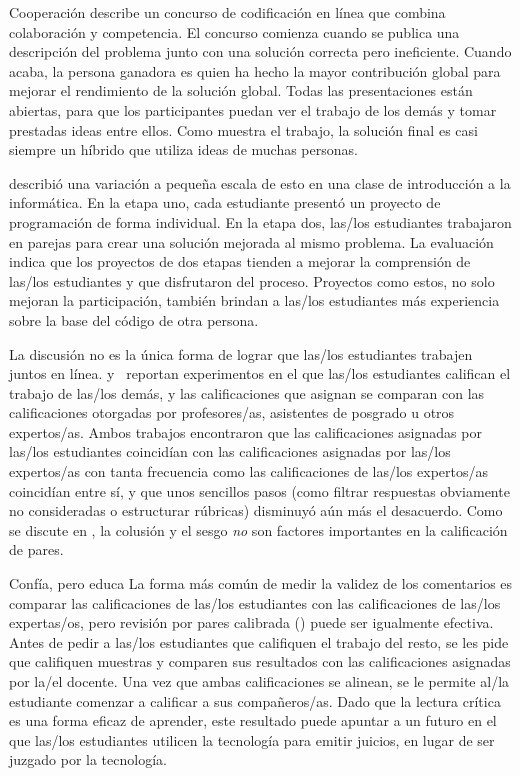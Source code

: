 \begin{aside}{Cooperación}
  \cite{Gull2004} describe un concurso de codificación en línea que combina colaboración y competencia.
  El concurso comienza cuando se publica una descripción del problema junto con una solución correcta pero ineficiente.
  Cuando acaba,
  la persona ganadora es quien ha hecho la mayor contribución global
  para mejorar el rendimiento de la solución global.
  Todas las presentaciones están abiertas,
  para que los participantes puedan ver el trabajo de los demás y tomar prestadas ideas entre ellos.
  Como muestra el trabajo,
  la solución final es casi siempre un híbrido que utiliza ideas de muchas personas.

  \cite{Batt2018} describió una variación a pequeña escala de esto en una clase de introducción a la informática.
  En la etapa uno,
  cada estudiante presentó un proyecto de programación de forma individual.
  En la etapa dos,
  las/los estudiantes trabajaron en parejas para crear una solución mejorada al mismo problema.
  La evaluación indica que los proyectos de dos etapas tienden a mejorar la comprensión de las/los estudiantes
  y que disfrutaron del proceso.
  Proyectos como estos, no solo mejoran la participación,
  también brindan a las/los estudiantes más experiencia sobre la base del código de otra persona.
\end{aside}

La discusión no es la única forma de lograr que las/los estudiantes trabajen juntos en línea.
\cite{Pare2008} y~\cite{Kulk2013} reportan experimentos
en el que las/los estudiantes califican el trabajo de las/los demás,
y las calificaciones que asignan se comparan con
las calificaciones otorgadas por profesores/as, asistentes de posgrado u otros expertos/as.
Ambos trabajos encontraron que las calificaciones asignadas por las/los estudiantes coincidían con las calificaciones asignadas por las/los expertos/as
con tanta frecuencia como las calificaciones de las/los expertos/as coincidían entre sí,
y que unos sencillos pasos
(como filtrar respuestas obviamente no consideradas o estructurar rúbricas)
disminuyó aún más el desacuerdo.
Como se discute en ,
la colusión y el sesgo \emph{no} son factores importantes en la calificación de pares.

\begin{aside}{Confía, pero educa}
  La forma más común de medir la validez de los comentarios
  es comparar las calificaciones de las/los estudiantes con las calificaciones de las/los expertas/os,
  pero revisión por pares calibrada () puede ser igualmente efectiva.
  Antes de pedir a las/los estudiantes que califiquen el trabajo del resto,
  se les pide que califiquen muestras y comparen sus resultados con las calificaciones asignadas por la/el docente.
  Una vez que ambas calificaciones se alinean,
  se le permite al/la estudiante comenzar a calificar a sus compañeros/as.
  Dado que la lectura crítica es una forma eficaz de aprender,
  este resultado puede apuntar a un futuro en el que las/los estudiantes utilicen la tecnología para emitir juicios,
  en lugar de ser juzgado por la tecnología.
\end{aside}

